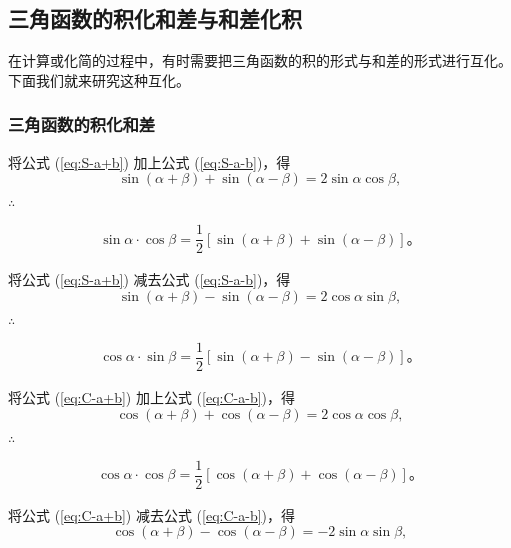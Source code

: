 \subsection{三角函数的积化和差与和差化积}\label{subsec:3-4}

在计算或化简的过程中，有时需要把三角函数的积的形式与和差的形式进行互化。下面我们就来研究这种互化。

\subsubsection{三角函数的积化和差}

将公式 (\ref{eq:S-a+b}) 加上公式 (\ref{eq:S-a-b})，得
$$\sin(\alpha + \beta) + \sin(\alpha - \beta) = 2\sin\alpha \cos\beta,$$

\jiange$\therefore$
\begin{minipage}{0.9\textwidth}
\begin{gather}
    \sin\alpha \cdot \cos\beta = \dfrac{1}{2} [\sin(\alpha + \beta) + \sin(\alpha - \beta)] \text{。} \tag{$1$}\label{eq:jhhc-s-c}
\end{gather}
\end{minipage}\jiange

将公式 (\ref{eq:S-a+b}) 减去公式 (\ref{eq:S-a-b})，得
$$\sin(\alpha + \beta) - \sin(\alpha - \beta) = 2\cos\alpha \sin\beta,$$

\jiange$\therefore$
\begin{minipage}{0.9\textwidth}
\begin{gather}
    \cos\alpha \cdot \sin\beta = \dfrac{1}{2} [\sin(\alpha + \beta) - \sin(\alpha - \beta)] \text{。} \tag{$2$}\label{eq:jhhc-c-s}
\end{gather}
\end{minipage}\jiange

将公式 (\ref{eq:C-a+b}) 加上公式 (\ref{eq:C-a-b})，得
$$\cos(\alpha + \beta) + \cos(\alpha - \beta) = 2\cos\alpha \cos\beta,$$

\jiange$\therefore$
\begin{minipage}{0.9\textwidth}
\begin{gather}
    \cos\alpha \cdot \cos\beta = \dfrac{1}{2} [\cos(\alpha + \beta) + \cos(\alpha - \beta)] \text{。} \tag{$3$}\label{eq:jhhc-c-c}
\end{gather}
\end{minipage}\jiange

将公式 (\ref{eq:C-a+b}) 减去公式 (\ref{eq:C-a-b})，得
$$\cos(\alpha + \beta) - \cos(\alpha - \beta) = -2\sin\alpha \sin\beta,$$

